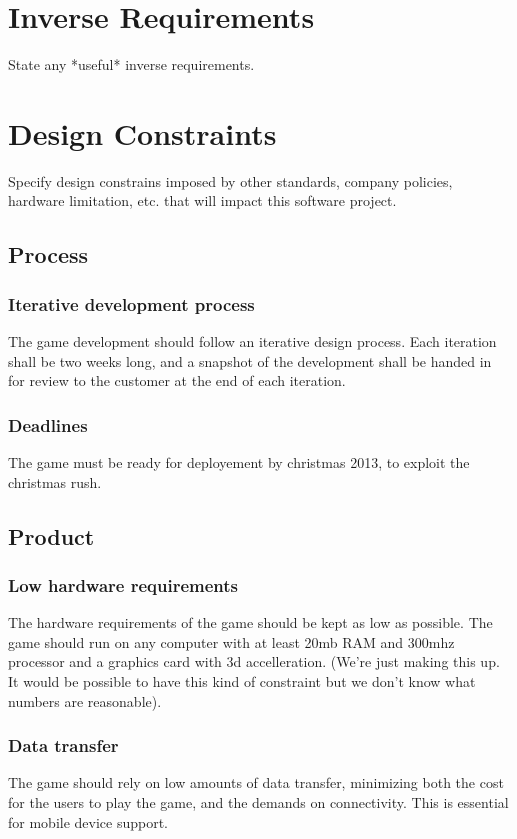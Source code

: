 \documentclass[a4paper,10pt]{article}
\begin{document}
\section{Inverse Requirements}
State any *useful* inverse requirements.

\section{Design Constraints}
Specify design constrains imposed by other standards, company policies, hardware limitation, etc. that will impact this software project.

\subsection{Process}
\subsubsection{Iterative development process}
The game development should follow an iterative design process. Each iteration shall be two weeks long, and a snapshot of the development shall be handed in for review to the customer at the end of each iteration.

\subsubsection{Deadlines}
The game must be ready for deployement by christmas 2013, to exploit the christmas rush.

\subsection{Product}
\subsubsection{Low hardware requirements}
\label{hwreq}
The hardware requirements of the game should be kept as low as possible. The game should run on any computer with at least 20mb RAM and 300mhz processor and a graphics card with 3d accelleration. (We're just making this up. It would be possible to have this kind of constraint but we don't know what numbers are reasonable).

\subsubsection{Data transfer}
The game should rely on low amounts of data transfer, minimizing both the cost for the users to play the game, and the demands on connectivity. This is essential for mobile device support.
\end{document}

